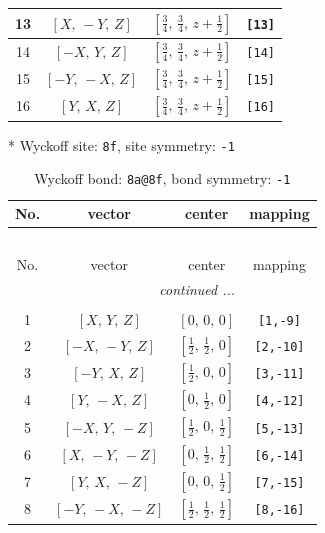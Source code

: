 \documentclass[fleqn,8pt]{jsarticle}
\begin{document}
\begin{longtable}{cccc}
13 & $\left[ X,\, - Y,\, Z \right]$ & $\left[ \frac{3}{4},\, \frac{3}{4},\, z + \frac{1}{2} \right]$ & {\tt [13]} \\ \hline
14 & $\left[ - X,\, Y,\, Z \right]$ & $\left[ \frac{3}{4},\, \frac{3}{4},\, z + \frac{1}{2} \right]$ & {\tt [14]} \\ \hline
15 & $\left[ - Y,\, - X,\, Z \right]$ & $\left[ \frac{3}{4},\, \frac{3}{4},\, z + \frac{1}{2} \right]$ & {\tt [15]} \\ \hline
16 & $\left[ Y,\, X,\, Z \right]$ & $\left[ \frac{3}{4},\, \frac{3}{4},\, z + \frac{1}{2} \right]$ & {\tt [16]} \\
\end{longtable}
* Wyckoff site: {\tt 8f}, site symmetry: {\tt -1}
\renewcommand{\arraystretch}{1.2}
\begin{longtable}{cccc}
\caption{Wyckoff bond: {\tt 8a@8f}, bond symmetry: {\tt -1}}
 \\
 \hline \hline
No. & vector & center & mapping \\ \hline \endfirsthead

\multicolumn{3}{l}{\tablename\ \thetable{}} \\
 \hline \hline
No. & vector & center & mapping \\ \hline \endhead

 \hline \hline
\multicolumn{3}{r}{\footnotesize\it continued ...} \\ \endfoot

 \hline \hline
\multicolumn{3}{r}{} \\ \endlastfoot

1 & $\left[ X,\, Y,\, Z \right]$ & $\left[ 0,\, 0,\, 0 \right]$ & {\tt [1,-9]} \\ \hline
2 & $\left[ - X,\, - Y,\, Z \right]$ & $\left[ \frac{1}{2},\, \frac{1}{2},\, 0 \right]$ & {\tt [2,-10]} \\ \hline
3 & $\left[ - Y,\, X,\, Z \right]$ & $\left[ \frac{1}{2},\, 0,\, 0 \right]$ & {\tt [3,-11]} \\ \hline
4 & $\left[ Y,\, - X,\, Z \right]$ & $\left[ 0,\, \frac{1}{2},\, 0 \right]$ & {\tt [4,-12]} \\ \hline
5 & $\left[ - X,\, Y,\, - Z \right]$ & $\left[ \frac{1}{2},\, 0,\, \frac{1}{2} \right]$ & {\tt [5,-13]} \\ \hline
6 & $\left[ X,\, - Y,\, - Z \right]$ & $\left[ 0,\, \frac{1}{2},\, \frac{1}{2} \right]$ & {\tt [6,-14]} \\ \hline
7 & $\left[ Y,\, X,\, - Z \right]$ & $\left[ 0,\, 0,\, \frac{1}{2} \right]$ & {\tt [7,-15]} \\ \hline
8 & $\left[ - Y,\, - X,\, - Z \right]$ & $\left[ \frac{1}{2},\, \frac{1}{2},\, \frac{1}{2} \right]$ & {\tt [8,-16]} \\
\end{longtable}
\end{document}
